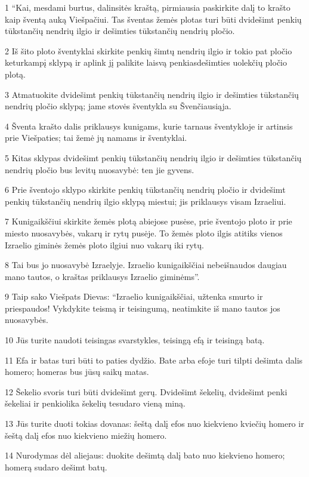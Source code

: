 \par 1 “Kai, mesdami burtus, dalinsitės kraštą, pirmiausia paskirkite dalį to krašto kaip šventą auką Viešpačiui. Tas šventas žemės plotas turi būti dvidešimt penkių tūkstančių nendrių ilgio ir dešimties tūkstančių nendrių pločio. 
\par 2 Iš šito ploto šventyklai skirkite penkių šimtų nendrių ilgio ir tokio pat pločio keturkampį sklypą ir aplink jį palikite laisvą penkiasdešimties uolekčių pločio plotą. 
\par 3 Atmatuokite dvidešimt penkių tūkstančių nendrių ilgio ir dešimties tūkstančių nendrių pločio sklypą; jame stovės šventykla su Švenčiausiąja. 
\par 4 Šventa krašto dalis priklausys kunigams, kurie tarnaus šventykloje ir artinsis prie Viešpaties; tai žemė jų namams ir šventyklai. 
\par 5 Kitas sklypas dvidešimt penkių tūkstančių nendrių ilgio ir dešimties tūkstančių nendrių pločio bus levitų nuosavybė: ten jie gyvens. 
\par 6 Prie šventojo sklypo skirkite penkių tūkstančių nendrių pločio ir dvidešimt penkių tūkstančių nendrių ilgio sklypą miestui; jis priklausys visam Izraeliui. 
\par 7 Kunigaikščiui skirkite žemės plotą abiejose pusėse, prie šventojo ploto ir prie miesto nuosavybės, vakarų ir rytų pusėje. To žemės ploto ilgis atitiks vienos Izraelio giminės žemės ploto ilgiui nuo vakarų iki rytų. 
\par 8 Tai bus jo nuosavybė Izraelyje. Izraelio kunigaikščiai nebeišnaudos daugiau mano tautos, o kraštas priklausys Izraelio giminėms”. 
\par 9 Taip sako Viešpats Dievas: “Izraelio kunigaikščiai, užtenka smurto ir priespaudos! Vykdykite teismą ir teisingumą, neatimkite iš mano tautos jos nuosavybės. 
\par 10 Jūs turite naudoti teisingas svarstykles, teisingą efą ir teisingą batą. 
\par 11 Efa ir batas turi būti to paties dydžio. Bate arba efoje turi tilpti dešimta dalis homero; homeras bus jūsų saikų matas. 
\par 12 Šekelio svoris turi būti dvidešimt gerų. Dvidešimt šekelių, dvidešimt penki šekeliai ir penkiolika šekelių tesudaro vieną miną. 
\par 13 Jūs turite duoti tokias dovanas: šeštą dalį efos nuo kiekvieno kviečių homero ir šeštą dalį efos nuo kiekvieno miežių homero. 
\par 14 Nurodymas dėl aliejaus: duokite dešimtą dalį bato nuo kiekvieno homero; homerą sudaro dešimt batų. 
